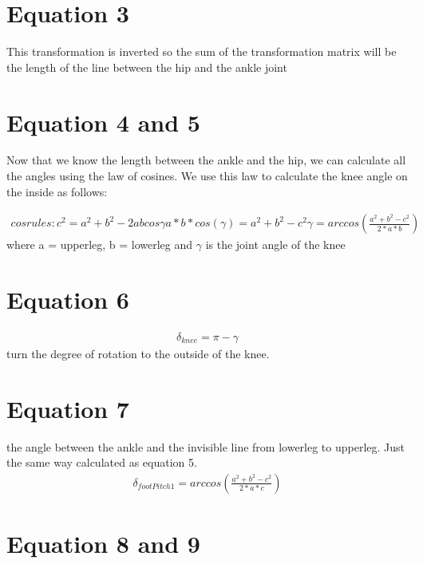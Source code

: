 \documentclass[a4paper]{article}
\begin{document}
\section*{Equation 3}
This transformation is inverted so the sum of the transformation matrix
will be the length of the line between the hip and the ankle joint

\section*{Equation 4 and 5}
Now that we know the length between the ankle and the hip, we can calculate all
the angles using the law of cosines. We use this law to calculate the knee angle
on the inside as follows:

\begin{align*}
    cosrules: c^2 = a^2 + b^2 - 2 ab cos\gamma
    a * b * cos(\gamma) =a^2 + b^2 -c^2
    \gamma = arccos(\frac{a^2 + b^2 - c^2}{2 * a * b})
\end{align*}
where a = upperleg, b = lowerleg and $\gamma$ is the joint angle of the knee  

\section*{Equation 6}

\begin{align*}
    \delta_{knee} = \pi - \gamma
\end{align*}
turn the degree of rotation to the outside of the knee.

\section*{Equation 7}
the angle between the ankle and the invisible line from lowerleg to upperleg.
Just the same way calculated as equation 5.
\begin{align*}
    \delta_{footPitch1} = arccos(\frac{a^2 + b^2 - c^2}{2*a*c})
\end{align*}

\section*{Equation 8 and 9}
\begin{align*}
\end{align*}
\end{document}
